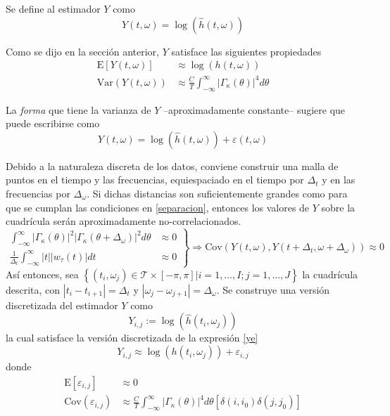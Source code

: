 \documentclass[12pt,letterpaper]{book}
\newcommand{\intR}{\int_{-\infty}^{\infty}}
\newcommand{\E}[1]{\mathrm{E}\left[ #1 \right]}
\newcommand{\Var}[1]{\mathrm{Var}\left( #1 \right)}
\newcommand{\Cov}[1]{\mathrm{Cov}\left( #1 \right)}
\newcommand{\abso}[1]{\left| #1 \right|}
\begin{document}
Se define al estimador $Y$ como
\begin{equation}
Y(t,\omega) = \log\left(\widehat{h}(t,\omega)\right)
\end{equation}

Como se dijo en la sección anterior, $Y$ satisface las siguientes propiedades
\begin{align}
\E{Y(t,\omega)} &\approx \log\left(h(t,\omega)\right) \\
\Var{Y(t,\omega)} &\approx \frac{C}{T} \intR \abso{\Gamma_\kappa(\theta)}^{4} d\theta
\end{align}

La \textit{forma} que tiene la varianza de $Y$ --aproximadamente constante-- sugiere que puede escribirse como
\begin{equation}
Y(t,\omega) = \log\left(\widehat{h}(t,\omega) \right) + \varepsilon(t,\omega)
\label{ye}
\end{equation}

Debido a la naturaleza discreta de los datos, conviene construir una malla de puntos en el tiempo y las frecuencias, equiespaciado en el tiempo por $\Delta_t$ y en las frecuencias por $\Delta_\omega$.
%
Si dichas distancias son suficientemente grandes como para que se cumplan las condiciones en \ref{separacion}, entonces los valores de $Y$ sobre la cuadrícula serán aproximadamente no-correlacionados.
%
\begin{equation}
\left.
\begin{aligned}
\intR \abso{\Gamma_\kappa(\theta)}^{2}\abso{\Gamma_\kappa(\theta+\Delta_\omega)}^{2} d\theta 
&\approx 0 \\
\frac{1}{\Delta_t} \intR \abso{t} \abso{w_\tau (t)} dt &\approx 0
\end{aligned}
\right\rbrace
\Rightarrow
\Cov{Y(t,\omega),Y(t+\Delta_t,\omega+\Delta_\omega)} \approx 0
\label{separacion}
\end{equation}
%
Así entonces, sea
$\left\{ (t_i,\omega_j) \in \mathcal{T} \times [-\pi,\pi] | i = 1,\dots,I ; j=1,\dots,J \right\}$
la cuadrícula descrita, con $\abso{t_i - t_{i+1}}= \Delta_t$ y 
$\abso{\omega_j-\omega_{j+1}}= \Delta_\omega$. 
%
Se construye una versión discretizada del estimador $Y$ como
\begin{equation}
Y_{i,j} := \log\left(\widehat{h}(t_i,\omega_j)\right)
\end{equation}
%
la cual satisface la versión discretizada de la expresión \ref{ye} 
\begin{equation}
Y_{i,j} \approx \log\left(h(t_i,\omega_j)\right) + \varepsilon_{i,j}
\label{def:ye}
\end{equation}
donde
\begin{align}
\E{\varepsilon_{i,j}} &\approx 0 \\
\Cov{\varepsilon_{i,j}} &\approx
\frac{C}{T} \intR \abso{\Gamma_\kappa(\theta)}^{4} d\theta \left[ \delta(i,i_0)\delta(j,j_0) \right]
\end{align}
\end{document}
